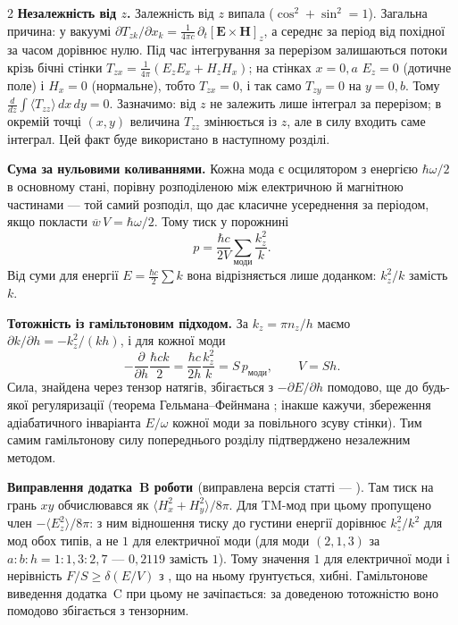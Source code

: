 \documentclass[twoside, 10pt]{article}
\begin{document}
\begin{multicols}{2}
\textbf{Незалежність від \(z\).} Залежність від \(z\) випала (\(\cos^2+\sin^2=1\)). Загальна
причина: у вакуумі \(\partial T_{zk}/\partial x_k=\frac1{4\pi c}\,\partial_t[\mathbf E\times\mathbf H]_z\),
а середнє за період від похідної за часом дорівнює нулю. Під час інтегрування за перерізом
залишаються потоки крізь бічні стінки \(T_{zx}=\frac1{4\pi}(E_zE_x+H_zH_x)\); на стінках
\(x=0,a\) \(E_z=0\) (дотичне поле) і \(H_x=0\) (нормальне), тобто \(T_{zx}=0\), і так само
\(T_{zy}=0\) на \(y=0,b\). Тому \(\frac{d}{dz}\int\langle T_{zz}\rangle\,dx\,dy=0\). Зазначимо:
від \(z\) не залежить лише інтеграл за перерізом; в окремій точці \((x,y)\) величина \(T_{zz}\)
змінюється із \(z\), але в силу входить саме інтеграл. Цей факт буде використано в наступному
розділі.

\textbf{Сума за нульовими коливаннями.} Кожна мода є осцилятором з енергією \(\hbar\omega/2\) в
основному стані, порівну розподіленою між електричною й магнітною частинами --- той самий
розподіл, що дає класичне усереднення за періодом, якщо покласти \(\overline w\,V=\hbar\omega/2\).
Тому тиск у порожнині
\[
p=\frac{\hbar c}{2V}\sum_{\text{моди}}\frac{k_z^2}{k}.
\]
Від суми для енергії \(E=\frac{\hbar c}{2}\sum k\) вона відрізняється лише доданком: \(k_z^2/k\)
замість \(k\).

\textbf{Тотожність із гамільтоновим підходом.} За \(k_z=\pi n_z/h\) маємо
\(\partial k/\partial h=-k_z^2/(kh)\), і для кожної моди
\[
-\frac{\partial}{\partial h}\frac{\hbar ck}{2}=\frac{\hbar c}{2h}\frac{k_z^2}{k}=S\,p_{\text{моди}},\qquad V=Sh .
\]
Сила, знайдена через тензор натягів, збігається з \(-\partial E/\partial h\) помодово, ще до
будь-якої регуляризації (теорема Гельмана--Фейнмана \cite{Feynman1939}; інакше кажучи, збереження
адіабатичного інваріанта \(E/\omega\) кожної моди за повільного зсуву стінки). Тим самим
гамільтонову силу попереднього розділу підтверджено незалежним методом.

\textbf{Виправлення додатка~B роботи \cite{Drozdov2024}} (виправлена версія статті --- \cite{Drozdov2024fix}). Там тиск на грань \(xy\) обчислювався
як \(\langle H_x^2+H_y^2\rangle/8\pi\). Для TM-мод при цьому пропущено член
\(-\langle E_z^2\rangle/8\pi\): з ним відношення тиску до густини енергії дорівнює \(k_z^2/k^2\)
для мод обох типів, а не \(1\) для електричної моди (для моди \((2,1,3)\) за
\(a:b:h=1:1{,}3:2{,}7\) --- \(0{,}2119\) замість \(1\)). Тому значення \(1\) для електричної моди
і нерівність \(F/S\ge\delta(E/V)\) з \cite{Drozdov2024}, що на ньому ґрунтується, хибні.
Гамільтонове виведення додатка~C при цьому не зачіпається: за доведеною тотожністю воно помодово
збігається з тензорним.


\end{multicols}
\end{document}
